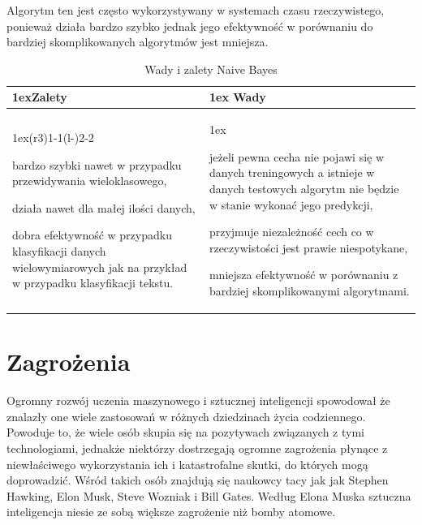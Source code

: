 Algorytm ten jest często wykorzystywany w systemach czasu rzeczywistego, ponieważ działa bardzo szybko jednak
jego efektywność w porównaniu do bardziej skomplikowanych algorytmów jest mniejsza.
\begin{table}[h]
    \begin{tabularx}{\linewidth}{>{\parskip1ex}X@{\kern4\tabcolsep}>{\parskip1ex}X}
    \toprule
    \hfil\bfseries Zalety
    &
    \hfil\bfseries Wady
    \\\cmidrule(r{3\tabcolsep}){1-1}\cmidrule(l{-\tabcolsep}){2-2}
    
    bardzo szybki nawet w przypadku przewidywania wieloklasowego,\par
    działa nawet dla małej ilości danych,\par
    dobra efektywność w przypadku klasyfikacji danych wielowymiarowych
    jak na przykład w przypadku klasyfikacji tekstu.\par
    
    &
    
    jeżeli pewna cecha nie pojawi się w danych treningowych a istnieje w danych 
    testowych algorytm nie będzie w stanie wykonać jego predykcji,\par
    przyjmuje niezależność cech co w rzeczywistości jest prawie niespotykane,\par
    mniejsza efektywność w porównaniu z bardziej skomplikowanymi algorytmami.\par
    
    \\\bottomrule
    \end{tabularx}
    \caption{Wady i zalety Naive Bayes}
\end{table}

\section{Zagrożenia}
Ogromny rozwój uczenia maszynowego i sztucznej inteligencji spowodował że znalazły one 
wiele zastosowań w różnych dziedzinach życia codziennego. Powoduje to, że wiele osób skupia się 
na pozytywach związanych
z tymi technologiami, jednakże niektórzy dostrzegają ogromne zagrożenia płynące z niewłaściwego 
wykorzystania ich i katastrofalne skutki, do których mogą doprowadzić. 
Wśród takich osób znajdują się naukowcy tacy jak jak Stephen Hawking, Elon Musk, Steve Wozniak i Bill Gates. 
Według Elona Muska sztuczna inteligencja niesie ze sobą większe zagrożenie niż bomby atomowe. ~\cite{dangers}

